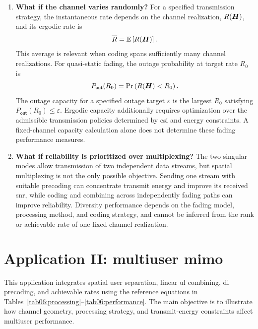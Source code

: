 \begin{enumerate}[label=\textbf{\arabic*.}]
	\item \textbf{What if the channel varies randomly?}
	For a specified transmission strategy, the instantaneous rate depends on the channel realization, $R(\bm{H})$, and its ergodic rate is
	\begin{equation*}
		\overline R=\mathbb{E}\left[R(\bm{H})\right].
	\end{equation*}
	This average is relevant when coding spans sufficiently many channel realizations. For quasi-static fading, the outage probability at target rate $R_0$ is
	\begin{equation*}
		P_{\mathsf{out}}(R_0)
		=\Pr\left(R(\bm{H})<R_0\right).
	\end{equation*}
	The outage capacity for a specified outage target $\varepsilon$ is the largest $R_0$ satisfying $P_{\mathsf{out}}(R_0)\leq\varepsilon$. Ergodic capacity additionally requires optimization over the admissible transmission policies determined by \ac{csi} and energy constraints. A fixed-channel capacity calculation alone does not determine these fading performance measures.
	
	\item \textbf{What if reliability is prioritized over multiplexing?}
	The two singular modes allow transmission of two independent data streams, but spatial multiplexing is not the only possible objective. Sending one stream with suitable precoding can concentrate transmit energy and improve its received \ac{snr}, while coding and combining across independently fading paths can improve reliability. Diversity performance depends on the fading model, processing method, and coding strategy, and cannot be inferred from the rank or achievable rate of one fixed channel realization.
\end{enumerate}


\section{Application II: multiuser \ac{mimo}}
\label{sec06:mu}
This application integrates spatial user separation, linear \ac{ul} combining, \ac{dl} precoding, and achievable rates using the reference equations in Tables~\ref{tab06:processing}--\ref{tab06:performance}. The main objective is to illustrate how channel geometry, processing strategy, and transmit-energy constraints affect multiuser performance.

